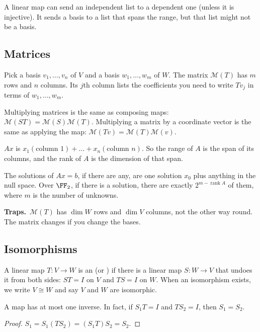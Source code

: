 \documentclass[11pt]{scrartcl}
\newcommand{\MM}{\mathcal M}
\newcommand{\traps}{\par\medskip\noindent\textbf{\color{RawSienna}Traps.}\ }
\begin{document}
A linear map can send an independent list to a dependent one (unless it is injective).
It sends a basis to a list that spans the range, but that list might not be a basis.

\subsection{Matrices}
\begin{definition*}
  Pick a basis $v_1,\dots,v_n$ of $V$ and a basis $w_1,\dots,w_m$ of $W$.
  The matrix $\MM(T)$ has $m$ rows and $n$ columns.
  Its $j$th column lists the coefficients you need to write $Tv_j$ in terms of $w_1,\dots,w_m$.
\end{definition*}

\begin{proposition*}[LADR 3.43, 3.76]
  Multiplying matrices is the same as composing maps: $\MM(ST)=\MM(S)\MM(T)$.
  Multiplying a matrix by a coordinate vector is the same as applying the map: $\MM(Tv)=\MM(T)\MM(v)$.
\end{proposition*}

\begin{proposition*}
  $Ax$ is $x_1(\text{column }1)+\dots+x_n(\text{column }n)$.
  So the range of $A$ is the span of its columns, and the rank of $A$ is the dimension of that span.

  The solutions of $Ax=b$, if there are any, are one solution $x_0$ plus anything in the null space.
  Over $\FF_2$, if there is a solution, there are exactly $2^{m-\operatorname{rank}A}$ of them, where $m$ is the number of unknowns.
\end{proposition*}

\traps $\MM(T)$ has $\dim W$ rows and $\dim V$ columns, not the other way round.
The matrix changes if you change the bases.

\subsection{Isomorphisms}
\begin{definition*}
  A linear map $T\colon V\to W$ is an  (or ) if there is a linear map $S\colon W\to V$ that undoes it from both sides: $ST=I$ on $V$ and $TS=I$ on $W$.
  When an isomorphism exists, we write $V\cong W$ and say $V$ and $W$ are isomorphic.
\end{definition*}

\begin{proposition*}[LADR 3.60]
  A map has at most one inverse.
  In fact, if $S_1T=I$ and $TS_2=I$, then $S_1=S_2$.
\end{proposition*}
\begin{proof}
  $S_1=S_1(TS_2)=(S_1T)S_2=S_2$.
\end{proof}
\end{document}
